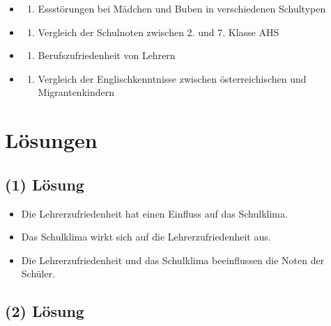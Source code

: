 \documentclass[
]{book}
\providecommand{\tightlist}{%
  \setlength{\itemsep}{0pt}\setlength{\parskip}{0pt}}
\begin{document}
\begin{itemize}
\item
  \begin{enumerate}
  \def\labelenumi{(\alph{enumi})}
  \tightlist
  \item
    Essstörungen bei Mädchen und Buben in verschiedenen Schultypen
  \end{enumerate}
\item
  \begin{enumerate}
  \def\labelenumi{(\alph{enumi})}
  \setcounter{enumi}{1}
  \tightlist
  \item
    Vergleich der Schulnoten zwischen 2. und 7. Klasse AHS
  \end{enumerate}
\item
  \begin{enumerate}
  \def\labelenumi{(\alph{enumi})}
  \setcounter{enumi}{2}
  \tightlist
  \item
    Berufszufriedenheit von Lehrern
  \end{enumerate}
\item
  \begin{enumerate}
  \def\labelenumi{(\alph{enumi})}
  \setcounter{enumi}{3}
  \tightlist
  \item
    Vergleich der Englischkenntnisse zwischen österreichischen und Migrantenkindern
  \end{enumerate}
\end{itemize}

\hypertarget{luxf6sungen}{%
\section{Lösungen}\label{luxf6sungen}}

\hypertarget{luxf6sung-2}{%
\subsection{(1) Lösung}\label{luxf6sung-2}}

\begin{itemize}
\tightlist
\item
  Die Lehrerzufriedenheit hat einen Einfluss auf das Schulklima.
\item
  Das Schulklima wirkt sich auf die Lehrerzufriedenheit aus.
\item
  Die Lehrerzufriedenheit und das Schulklima beeinflussen die Noten der Schüler.
\end{itemize}

\hypertarget{luxf6sung-3}{%
\subsection{(2) Lösung}\label{luxf6sung-3}}
\end{document}
